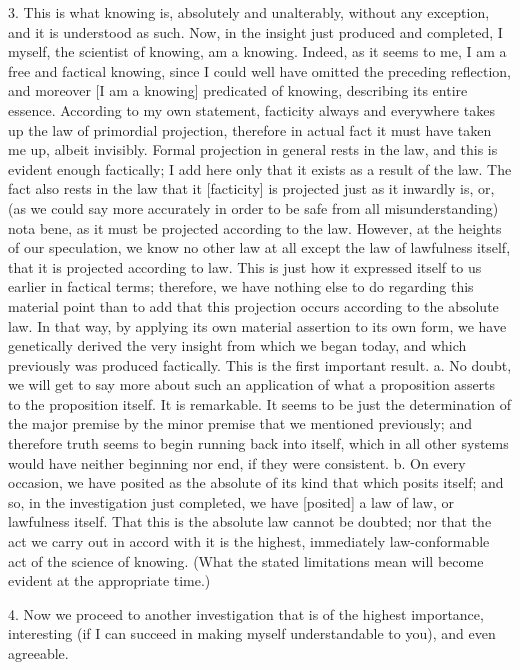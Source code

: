 3. This is what knowing is, absolutely and unalterably,
without any exception, and it is understood as such.
Now, in the insight just produced and completed,
I myself, the scientist of knowing, am a knowing.
Indeed, as it seems to me,
I am a free and factical knowing,
since I could well have omitted the preceding reflection,
and moreover [I am a knowing] predicated of knowing,
describing its entire essence.
According to my own statement,
facticity always and everywhere takes up
the law of primordial projection,
therefore in actual fact it must have
taken me up, albeit invisibly.
Formal projection in general rests in the law,
and this is evident enough factically;
I add here only that it exists as a result of the law.
The fact also rests in the law
that it [facticity] is projected just as it inwardly is,
or, (as we could say more accurately
in order to be safe from all misunderstanding)
nota bene, as it must be projected according to the law.
However, at the heights of our speculation,
we know no other law at all except
the law of lawfulness itself,
that it is projected according to law.
This is just how it expressed itself to us earlier in factical terms;
therefore, we have nothing else to do regarding this material point
than to add that this projection occurs according to the absolute law.
In that way, by applying its own material assertion to its own form,
we have genetically derived the very insight from which we began today,
and which previously was produced factically.
This is the first important result.
a. No doubt, we will get to say more about such an application of
what a proposition asserts to the proposition itself.
It is remarkable.
It seems to be just the determination of
the major premise by the minor premise
that we mentioned previously;
and therefore truth seems to begin running back into itself,
which in all other systems would have neither beginning nor end,
if they were consistent.
b. On every occasion, we have posited as
the absolute of its kind that which posits itself;
and so, in the investigation just completed,
we have [posited] a law of law, or lawfulness itself.
That this is the absolute law cannot be doubted;
nor that the act we carry out in accord with it is
the highest, immediately law-conformable
act of the science of knowing.
(What the stated limitations mean
will become evident at the appropriate time.)

4. Now we proceed to another investigation
that is of the highest importance, interesting
(if I can succeed in making myself understandable to you),
and even agreeable.

